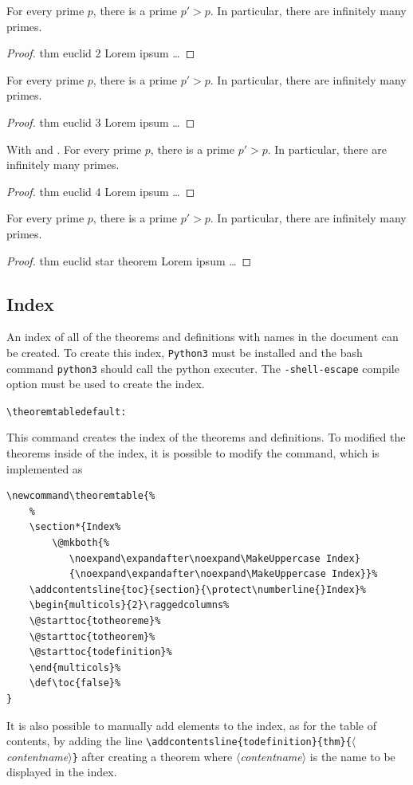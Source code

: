 \documentclass[12pt, babellanguage=british, titlespace, defaulttheorems]{altarticle}
\newcommand{\aargt}[1]{\ensuremath{\langle}\textrm{{\emph{#1}}}\ensuremath{\rangle}}
\newcommand{\argt}[1]{\texttt{\{}\ensuremath{\langle}\textrm{{\emph{#1}}}\ensuremath{\rangle}\texttt{\}}}
\newcommand{\commandline}[1][]{\def\argI{#1}\ccommandline}
\newcommand{\ccommandline}[2][]{\par\medskip\hspace*{-.75cm}\texttt{\textbackslash#2}\argI{}\hfill\if\relax\detokenize{#1}\relax\else\texttt{default:~#1}\fi\par}
\begin{document}
For every prime $p$, there is a prime $p'>p$. In particular, there are infinitely many primes.
\begin{proof}{thm euclid 2}
    Lorem ipsum \dots
\end{proof}
For every prime $p$, there is a prime $p'>p$. In particular, there are infinitely many primes.
\begin{proof}{thm euclid 3}
    Lorem ipsum \dots
\end{proof}
With  and {\boldmath{}}.
For every prime $p$, there is a prime $p'>p$. In particular, there are infinitely many primes.
\begin{proof}{thm euclid 4}
    Lorem ipsum \dots
\end{proof}
For every prime $p$, there is a prime $p'>p$. In particular, there are infinitely many primes.
\begin{proof}{thm euclid star theorem}
    Lorem ipsum \dots
\end{proof}
\subsection{Index}
An index of all of the theorems and definitions with names in the document can be created. To create this index, \texttt{Python3} must be installed and the bash command \texttt{python3} should call the python executer. The \texttt{-shell-escape} compile option must be used to create the index.
\commandline{theoremtable}This command creates the index of the theorems and definitions. To modified the theorems inside of the index, it is possible to modify the command, which is implemented as
\begin{verbatim}
\newcommand\theoremtable{%
    %
    \section*{Index%
        \@mkboth{%
           \noexpand\expandafter\noexpand\MakeUppercase Index}
           {\noexpand\expandafter\noexpand\MakeUppercase Index}}%
    \addcontentsline{toc}{section}{\protect\numberline{}Index}%
    \begin{multicols}{2}\raggedcolumns%
    \@starttoc{totheoreme}%
    \@starttoc{totheorem}%
    \@starttoc{todefinition}%
    \end{multicols}%
    \def\toc{false}%
}
\end{verbatim}
It is also possible to manually add elements to the index, as for the table of contents, by adding the line \texttt{\textbackslash addcontentsline\{todefinition\}\{thm\}}\argt{contentname} after creating a theorem where \aargt{contentname} is the name to be displayed in the index.
\end{document}

